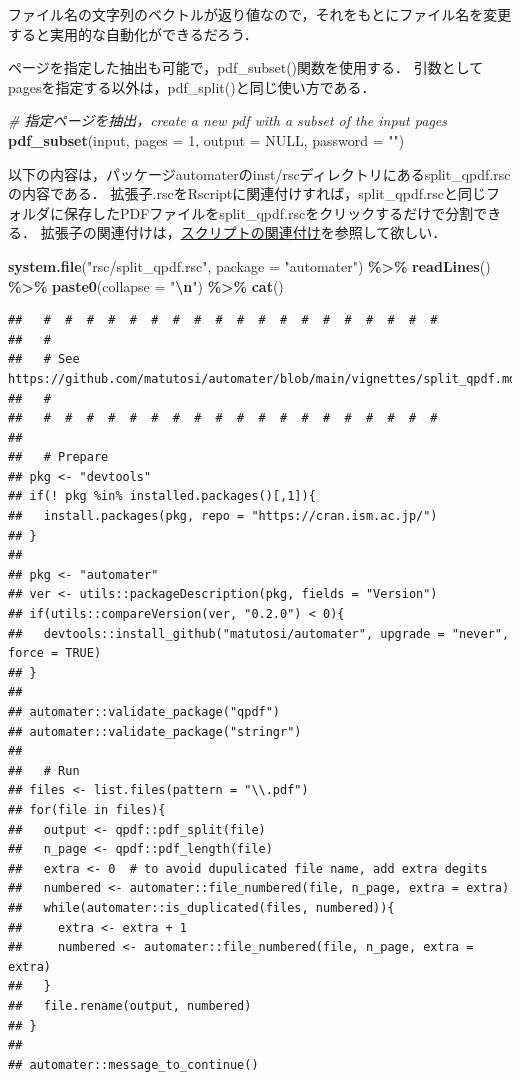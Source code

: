 \documentclass[
]{article}
\newenvironment{Shaded}{\begin{snugshade}}{\end{snugshade}}
\newcommand{\AttributeTok}[1]{\textcolor[rgb]{0.13,0.29,0.53}{#1}}
\newcommand{\CommentTok}[1]{\textcolor[rgb]{0.56,0.35,0.01}{\textit{#1}}}
\newcommand{\ConstantTok}[1]{\textcolor[rgb]{0.56,0.35,0.01}{#1}}
\newcommand{\DecValTok}[1]{\textcolor[rgb]{0.00,0.00,0.81}{#1}}
\newcommand{\FunctionTok}[1]{\textcolor[rgb]{0.13,0.29,0.53}{\textbf{#1}}}
\newcommand{\NormalTok}[1]{#1}
\newcommand{\SpecialCharTok}[1]{\textcolor[rgb]{0.81,0.36,0.00}{\textbf{#1}}}
\newcommand{\StringTok}[1]{\textcolor[rgb]{0.31,0.60,0.02}{#1}}
\begin{document}
ファイル名の文字列のベクトルが返り値なので，それをもとにファイル名を変更すると実用的な自動化ができるだろう．

ページを指定した抽出も可能で，pdf\_subset()関数を使用する．
引数としてpagesを指定する以外は，pdf\_split()と同じ使い方である．

\begin{Shaded}
\begin{Highlighting}[]
  \CommentTok{\# 指定ページを抽出，create a new pdf with a subset of the input pages}
\FunctionTok{pdf\_subset}\NormalTok{(input, }\AttributeTok{pages =} \DecValTok{1}\NormalTok{, }\AttributeTok{output =} \ConstantTok{NULL}\NormalTok{, }\AttributeTok{password =} \StringTok{""}\NormalTok{)}
\end{Highlighting}
\end{Shaded}

以下の内容は，パッケージautomaterのinst/rscディレクトリにあるsplit\_qpdf.rscの内容である．
拡張子.rscをRscriptに関連付けすれば，split\_qpdf.rscと同じフォルダに保存したPDFファイルをsplit\_qpdf.rscをクリックするだけで分割できる．
拡張子の関連付けは，\protect\hyperlink{assoc}{スクリプトの関連付け}を参照して欲しい．

\begin{Shaded}
\begin{Highlighting}[]
\FunctionTok{system.file}\NormalTok{(}\StringTok{"rsc/split\_qpdf.rsc"}\NormalTok{, }\AttributeTok{package =} \StringTok{"automater"}\NormalTok{) }\SpecialCharTok{\%\textgreater{}\%}
  \FunctionTok{readLines}\NormalTok{() }\SpecialCharTok{\%\textgreater{}\%}
  \FunctionTok{paste0}\NormalTok{(}\AttributeTok{collapse =} \StringTok{"}\SpecialCharTok{\textbackslash{}n}\StringTok{"}\NormalTok{) }\SpecialCharTok{\%\textgreater{}\%}
  \FunctionTok{cat}\NormalTok{()}
\end{Highlighting}
\end{Shaded}

\begin{verbatim}
##   #  #  #  #  #  #  #  #  #  #  #  #  #  #  #  #  #  #  # 
##   # 
##   # See https://github.com/matutosi/automater/blob/main/vignettes/split_qpdf.md
##   # 
##   #  #  #  #  #  #  #  #  #  #  #  #  #  #  #  #  #  #  # 
## 
##   # Prepare
## pkg <- "devtools"
## if(! pkg %in% installed.packages()[,1]){
##   install.packages(pkg, repo = "https://cran.ism.ac.jp/")
## }
## 
## pkg <- "automater"
## ver <- utils::packageDescription(pkg, fields = "Version")
## if(utils::compareVersion(ver, "0.2.0") < 0){
##   devtools::install_github("matutosi/automater", upgrade = "never", force = TRUE)
## }
## 
## automater::validate_package("qpdf")
## automater::validate_package("stringr")
## 
##   # Run
## files <- list.files(pattern = "\\.pdf")
## for(file in files){
##   output <- qpdf::pdf_split(file)
##   n_page <- qpdf::pdf_length(file)
##   extra <- 0  # to avoid dupulicated file name, add extra degits
##   numbered <- automater::file_numbered(file, n_page, extra = extra)
##   while(automater::is_duplicated(files, numbered)){
##     extra <- extra + 1
##     numbered <- automater::file_numbered(file, n_page, extra = extra)
##   }
##   file.rename(output, numbered)
## }
## 
## automater::message_to_continue()
\end{verbatim}
\end{document}
